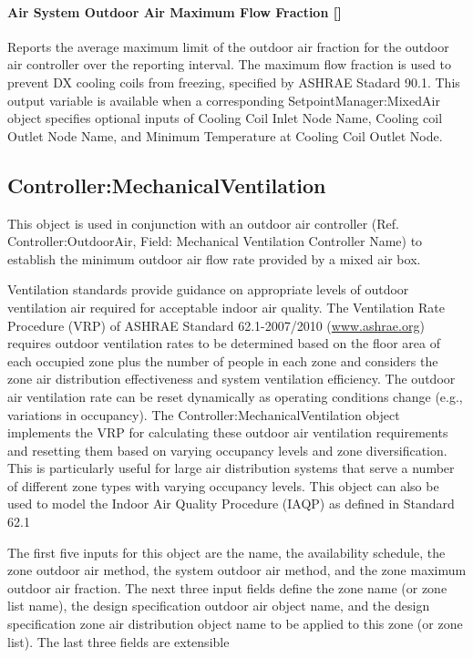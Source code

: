 \paragraph{Air System Outdoor Air Maximum Flow Fraction {[]}}\label{air-system-outdoor-air-maximum-flow-fraction}

Reports the average maximum limit of the outdoor air fraction for the outdoor air controller over the reporting interval. The maximum flow fraction is used to prevent DX cooling coils from freezing, specified by ASHRAE Stadard 90.1. This output variable is available when a corresponding SetpointManager:MixedAir object specifies optional inputs of Cooling Coil Inlet Node Name, Cooling coil Outlet Node Name, and Minimum Temperature at Cooling Coil Outlet Node.

\subsection{Controller:MechanicalVentilation}\label{controllermechanicalventilation}

This object is used in conjunction with an outdoor air controller (Ref. Controller:OutdoorAir, Field: Mechanical Ventilation Controller Name) to establish the minimum outdoor air flow rate provided by a mixed air box.

Ventilation standards provide guidance on appropriate levels of outdoor ventilation air required for acceptable indoor air quality. The Ventilation Rate Procedure (VRP) of ASHRAE Standard 62.1-2007/2010 (\href{http://www.ashrae.org}{www.ashrae.org}) requires outdoor ventilation rates to be determined based on the floor area of each occupied zone plus the number of people in each zone and considers the zone air distribution effectiveness and system ventilation efficiency. The outdoor air ventilation rate can be reset dynamically as operating conditions change (e.g., variations in occupancy). The Controller:MechanicalVentilation object implements the VRP for calculating these outdoor air ventilation requirements and resetting them based on varying occupancy levels and zone diversification. This is particularly useful for large air distribution systems that serve a number of different zone types with varying occupancy levels. This object can also be used to model the Indoor Air Quality Procedure (IAQP) as defined in Standard 62.1

The first five inputs for this object are the name, the availability schedule, the zone outdoor air method, the system outdoor air method, and the zone maximum outdoor air fraction. The next three input fields define the zone name (or zone list name), the design specification outdoor air object name, and the design specification zone air distribution object name to be applied to this zone (or zone list). The last three fields are extensible


